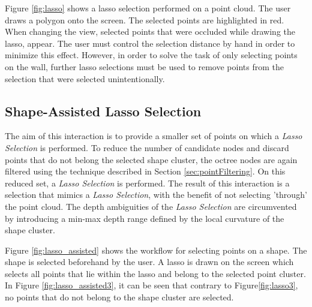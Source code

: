 Figure \ref{fig:lasso} shows a lasso selection performed on a point cloud. The user draws a polygon onto the screen. The selected points are highlighted in red. When changing the view, selected points that were occluded while drawing the lasso, appear. The user must control the selection distance by hand in order to minimize this effect. However, in order to solve the task of only selecting points on the wall, further lasso selections must be used to remove points from the selection that were selected unintentionally. 


\subsection{Shape-Assisted Lasso Selection}

The aim of this interaction is to provide a smaller set of points on which a \textit{Lasso Selection} is performed.  To reduce the number of candidate nodes and discard points that do not belong the selected shape cluster, the octree nodes are again filtered using the technique described in Section \ref{sec:pointFiltering}. On this reduced set, a \textit{Lasso Selection} is performed. The result of this interaction is a selection that mimics a \textit{Lasso Selection}, with the benefit of not selecting 'through' the point cloud. The depth ambiguities of the \textit{Lasso Selection} are circumvented by introducing a min-max depth range defined by the local curvature of the shape cluster. 

Figure \ref{fig:lasso_assisted} shows the workflow for selecting points on a shape. The shape is selected beforehand by the user. A lasso is drawn on the screen which selects all points that lie within the lasso and belong to the selected point cluster. In Figure \ref{fig:lasso_assisted3}, it can be seen that contrary to Figure\ref{fig:lasso3}, no points that do not belong to the shape cluster are selected. 

